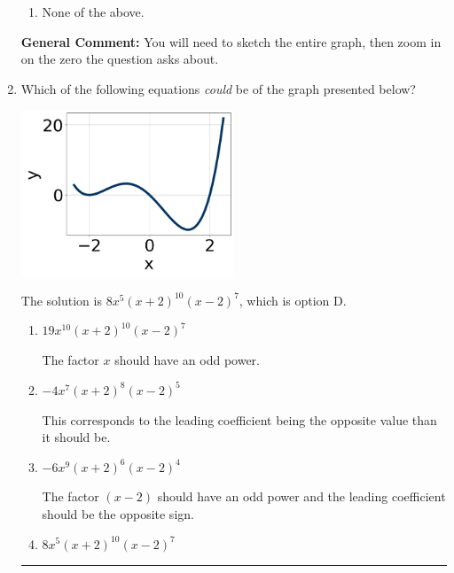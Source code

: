 \documentclass{extbook}[14pt]
\newcommand{\litem}[1]{\item #1

\rule{\textwidth}{0.4pt}}
\begin{document}
\begin{enumerate}
{\begin{enumerate}[label=\Alph*.]
\item None of the above.\end{enumerate}
\textbf{General Comment:} You will need to sketch the entire graph, then zoom in on the zero the question asks about.
}
\litem{
Which of the following equations \textit{could} be of the graph presented below?

\begin{center}
    \includegraphics[width=0.5\textwidth]{../Figures/polyGraphToFunctionA.png}
\end{center}


The solution is \( 8x^{5} (x + 2)^{10} (x - 2)^{7} \), which is option D.\begin{enumerate}[label=\Alph*.]
\item \( 19x^{10} (x + 2)^{10} (x - 2)^{7} \)

The factor $x$ should have an odd power.
\item \( -4x^{7} (x + 2)^{8} (x - 2)^{5} \)

This corresponds to the leading coefficient being the opposite value than it should be.
\item \( -6x^{9} (x + 2)^{6} (x - 2)^{4} \)

The factor $(x - 2)$ should have an odd power and the leading coefficient should be the opposite sign.
\item \( 8x^{5} (x + 2)^{10} (x - 2)^{7} \)


\end{enumerate}}
\end{enumerate}
\end{document}
